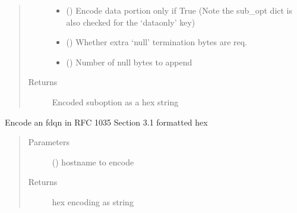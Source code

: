 \documentclass[letterpaper,10pt,english]{sphinxmanual}
\begin{document}
\begin{fulllineitems}
\begin{fulllineitems}
\begin{quote}
\begin{description}
\begin{itemize}
\item {} 
\sphinxAtStartPar
{} () \textendash{} Encode data portion only if True
(Note the sub\_opt dict is also checked for
the ‘data\sphinxhyphen{}only’ key)

\item {} 
\sphinxAtStartPar
{} () \textendash{} Whether extra ‘null’ termination bytes are req.

\item {} 
\sphinxAtStartPar
{} () \textendash{} Number of null bytes to append

\end{itemize}

\item[{Returns}] \leavevmode
\sphinxAtStartPar
Encoded suboption as a hex string

\end{description}\end{quote}

\end{fulllineitems}


\begin{fulllineitems}
\label{\detokenize{dhcp_encode-class:bloxone.dhcp_encode.fqdn_to_hex}}
\sphinxAtStartPar
Encode an fdqn in RFC 1035 Section 3.1 formatted hex
\begin{quote}\begin{description}
\item[{Parameters}] \leavevmode
\sphinxAtStartPar
{} () \textendash{} hostname to encode

\item[{Returns}] \leavevmode
\sphinxAtStartPar
hex encoding as string

\end{description}\end{quote}

\end{fulllineitems}


\end{fulllineitems}
\end{document}
